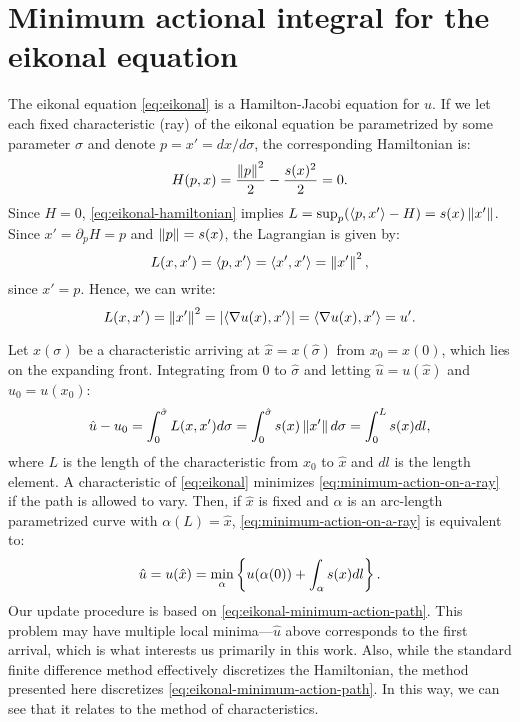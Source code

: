 \documentclass[eikonal.tex]{subfiles}
\begin{document}
\section[Minimum action integral]{Minimum actional integral for the
  eikonal equation}\label{sec:minimum-action-integral} The eikonal
equation \cref{eq:eikonal} is a Hamilton-Jacobi equation
for $u$. If we let each fixed characteristic (ray) of the eikonal
equation be parametrized by some parameter $\sigma$ and denote
$p = x' = dx/d\sigma$, the corresponding Hamiltonian is:
\begin{equation}
  \label{eq:eikonal-hamiltonian}
  H{(p, x)} = \frac{\norm{p}^2}{2} - \frac{s(x)^2}{2} = 0.
\end{equation}
Since $H = 0$, \cref{eq:eikonal-hamiltonian} implies
$L = \sup_p (\langle p, x' \rangle - H) = s(x) \left\|x'\right\|$. Since
$x' = \partial_p H = p$ and $\left\|p\right\| = s(x)$, the Lagrangian is given
by:
\begin{equation}
  \label{eq:eikonal-lagrangian}
  L(x, x') = \langle p, x'\rangle = \langle x', x'\rangle = \norm{x'}^2,
\end{equation}
since $x' = p $. Hence, we can write:
\begin{equation}
  L(x, x') = \left\|x'\right\|^2 = \left|\langle \nabla u(x), x'\rangle\right| = \langle \nabla u(x), x'\rangle = u'.
\end{equation}

Let $x(\sigma)$ be a characteristic arriving at
$\hat{x} = x(\hat\sigma)$ from $x_0 = x(0)$, which lies on the
expanding front. Integrating from $0$ to $\hat\sigma$ and letting
$\hat u = u(\hat x)$ and $u_0 = u(x_0)$:
\begin{equation}
  \label{eq:minimum-action-on-a-ray}
  \hat u - u_0 = \int_{0}^{\hat\sigma} L(x, x') d\sigma = \int_{0}^{\hat\sigma} s(x) \norm{x'} d\sigma = \int_0^L s(x) dl,
\end{equation}
where $L$ is the length of the characteristic from $x_0$ to $\hat{x}$
and $dl$ is the length element. A characteristic of \cref{eq:eikonal}
minimizes \cref{eq:minimum-action-on-a-ray} if the path is allowed to
vary. Then, if $\hat{x}$ is fixed and $\alpha$ is an arc-length
parametrized curve with $\alpha(L) = \hat{x}$,
\cref{eq:minimum-action-on-a-ray} is equivalent to:
\begin{equation}\label{eq:eikonal-minimum-action-path}
  \hat{u} = u(\hat{x}) = \min_\alpha \curlyb{u(\alpha(0)) + \int_\alpha s(x) dl}.
\end{equation}
Our update procedure is based on
\cref{eq:eikonal-minimum-action-path}. This problem may have multiple
local minima---$\hat{u}$ above corresponds to the first arrival, which
is what interests us primarily in this work. Also, while the standard
finite difference method effectively discretizes the Hamiltonian, the
method presented here discretizes
\cref{eq:eikonal-minimum-action-path}. In this way, we can see that it
relates to the method of characteristics.
\end{document}
